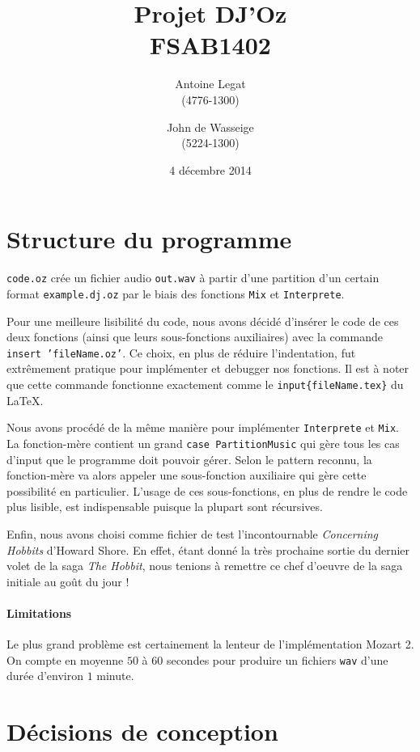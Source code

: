 \documentclass[a4paper,oneside,10pt]{article}
\title{Projet DJ'Oz \\ \small{FSAB1402}}
\author{Antoine Legat \\(4776-1300) \and John de Wasseige \\(5224-1300)}
\date{4 décembre 2014}
\newcommand{\fun}[1]{\texttt{#1}}
\newcommand{\bslash}{\texttt{\symbol{92}}}
\begin{document}
\maketitle

\section{Structure du programme}
\fun{code.oz} crée un fichier audio \fun{out.wav} à partir d'une partition d'un certain format \fun{example.dj.oz} par le biais des fonctions \fun{Mix} et \fun{Interprete}.

Pour une meilleure lisibilité du code, nous avons décidé d'insérer le code de ces deux fonctions (ainsi que leurs sous-fonctions auxiliaires) avec la commande \fun{\bslash insert 'fileName.oz'}. Ce choix, en plus de réduire l'indentation, fut extrêmement pratique pour implémenter et debugger nos fonctions. Il est à noter que cette commande fonctionne exactement comme le \fun{\bslash input\{fileName.tex\}} du \LaTeX.

Nous avons procédé de la même manière pour implémenter \fun{Interprete} et \fun{Mix}. La fonction-mère contient un grand \fun{case Partition\bslash Music} qui gère tous les cas d'input que le programme doit pouvoir gérer. Selon le pattern reconnu, la fonction-mère va alors appeler une sous-fonction auxiliaire qui gère cette possibilité en particulier. L'usage de ces sous-fonctions, en plus de rendre le code plus lisible, est indispensable puisque la plupart sont récursives.

Enfin, nous avons choisi comme fichier de test l'incontournable \textit{Concerning Hobbits} d'Howard Shore. En effet, étant donné la très prochaine sortie du dernier volet de la saga \textit{The Hobbit}, nous tenions à remettre ce chef d'oeuvre de la saga initiale au goût du jour !

\paragraph{Limitations}
Le plus grand problème est certainement la lenteur de l'implémentation Mozart 2. 
On compte en moyenne $50$ à $60$ secondes pour produire un fichiers \fun{wav} d'une 
durée d'environ $1$ minute.

\section{Décisions de conception}
\end{document}
